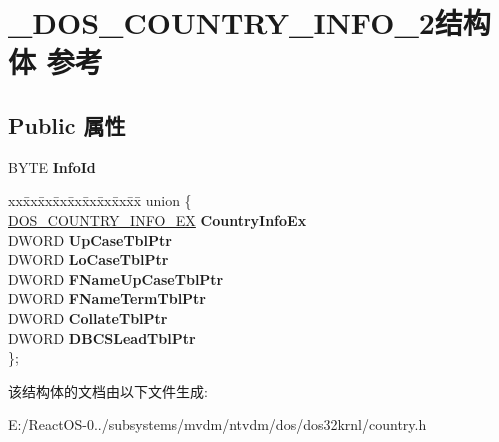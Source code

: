 \hypertarget{struct___d_o_s___c_o_u_n_t_r_y___i_n_f_o__2}{}\section{\+\_\+\+D\+O\+S\+\_\+\+C\+O\+U\+N\+T\+R\+Y\+\_\+\+I\+N\+F\+O\+\_\+2结构体 参考}
\label{struct___d_o_s___c_o_u_n_t_r_y___i_n_f_o__2}
\subsection*{Public 属性}
\begin{DoxyCompactItemize}
\item 
\mbox{\label{struct___d_o_s___c_o_u_n_t_r_y___i_n_f_o__2_a1989720043a9bf92b997baf24086e0fb}} 
B\+Y\+TE {\bfseries Info\+Id}
\item 
\mbox{\label{struct___d_o_s___c_o_u_n_t_r_y___i_n_f_o__2_a4d091391fadea5e5d16cace062967c6c}} 
\begin{tabbing}
xx\=xx\=xx\=xx\=xx\=xx\=xx\=xx\=xx\=\kill
union \{\\
\>\hyperlink{struct___d_o_s___c_o_u_n_t_r_y___i_n_f_o___e_x}{DOS\_COUNTRY\_INFO\_EX} {\bfseries CountryInfoEx}\\
\>DWORD {\bfseries UpCaseTblPtr}\\
\>DWORD {\bfseries LoCaseTblPtr}\\
\>DWORD {\bfseries FNameUpCaseTblPtr}\\
\>DWORD {\bfseries FNameTermTblPtr}\\
\>DWORD {\bfseries CollateTblPtr}\\
\>DWORD {\bfseries DBCSLeadTblPtr}\\
\}; \\

\end{tabbing}\end{DoxyCompactItemize}


该结构体的文档由以下文件生成\+:\begin{DoxyCompactItemize}
\item 
E\+:/\+React\+O\+S-\/0../subsystems/mvdm/ntvdm/dos/dos32krnl/country.\+h\end{DoxyCompactItemize}

